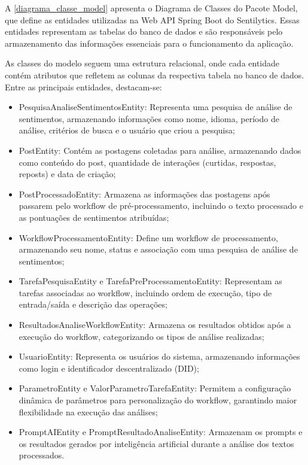 \documentclass[
	12pt,				%
	oneside,			%
	a4paper,			%
	english,			%
	french,				%
	spanish,			%
	brazil				%
	]{abntex2}
\begin{document}
A \autoref{diagrama_classe_model} apresenta o Diagrama de Classes do
Pacote Model, que define as entidades utilizadas na Web API Spring Boot
do Sentilytics. Essas entidades representam as tabelas do banco de dados
e são responsáveis pelo armazenamento das informações essenciais para o
funcionamento da aplicação.

As classes do modelo seguem uma estrutura relacional, onde cada entidade
contém atributos que refletem as colunas da respectiva tabela no banco
de dados. Entre as principais entidades, destacam-se:

\begin{itemize}
\tightlist
\item
  PesquisaAnaliseSentimentosEntity: Representa uma pesquisa de análise
  de sentimentos, armazenando informações como nome, idioma, período de
  análise, critérios de busca e o usuário que criou a pesquisa;
\item
  PostEntity: Contém as postagens coletadas para análise, armazenando
  dados como conteúdo do post, quantidade de interações (curtidas,
  respostas, reposts) e data de criação;
\item
  PostProcessadoEntity: Armazena as informações das postagens após
  passarem pelo workflow de pré-processamento, incluindo o texto
  processado e as pontuações de sentimentos atribuídas;
\item
  WorkflowProcessamentoEntity: Define um workflow de processamento,
  armazenando seu nome, status e associação com uma pesquisa de análise
  de sentimentos;
\item
  TarefaPesquisaEntity e TarefaPreProcessamentoEntity: Representam as
  tarefas associadas ao workflow, incluindo ordem de execução, tipo de
  entrada/saída e descrição das operações;
\item
  ResultadosAnaliseWorkflowEntity: Armazena os resultados obtidos após a
  execução do workflow, categorizando os tipos de análise realizadas;
\item
  UsuarioEntity: Representa os usuários do sistema, armazenando
  informações como login e identificador descentralizado (DID);
\item
  ParametroEntity e ValorParametroTarefaEntity: Permitem a configuração
  dinâmica de parâmetros para personalização do workflow, garantindo
  maior flexibilidade na execução das análises;
\item
  PromptAIEntity e PromptResultadoAnaliseEntity: Armazenam os prompts e
  os resultados gerados por inteligência artificial durante a análise
  dos textos processados.
\end{itemize}
\end{document}
